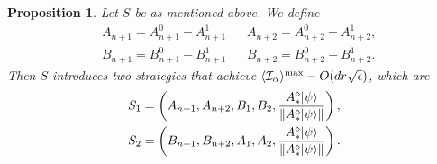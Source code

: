 \documentclass[11pt,letterpaper]{article}
\newcommand{\ket}[1]{|#1\rangle}
\DeclarePairedDelimiter{\norm}{\lVert}{\rVert}
\DeclarePairedDelimiter{\ip}{\langle}{\rangle}
\DeclareMathOperator{\spn}{span}
\newcommand{\1}{\mathbb{1}}
\newcommand{\I}{\mathcal{I}}
\newcommand{\se}{\sqrt{\epsilon}}
\newtheorem{proposition}[theorem]{Proposition}
\theoremstyle{definition}
\begin{document}
\begin{proposition}
	Let $S$ be as mentioned above. We define
	\begin{align}
		&A_{n+1} = A_{n+1}^0 - A_{n+1}^1 && A_{n+2} = A_{n+2}^0 - A_{n+2}^1,\\
		&B_{n+1} = B_{n+1}^0 - B_{n+1}^1 && B_{n+2} = B_{n+2}^0 - B_{n+2}^1.
	\end{align}
	Then $S$ introduces two strategies that achieve $\ip{\I_\alpha}^{\max} - O(d r\se)$, which are
	\begin{align}
		S_1 = \left(A_{n+1}, A_{n+2}, B_1, B_2, \frac{A_\ast^\diamond\ket{\psi}}{\norm{A_\ast^\diamond\ket{\psi}}}\right),\\
		S_2 = \left(B_{n+1}, B_{n+2}, A_1, A_2, \frac{A_\ast^\diamond\ket{\psi}}{\norm{A_\ast^\diamond\ket{\psi}}}\right).
	\end{align}
\end{proposition}
\end{document}
